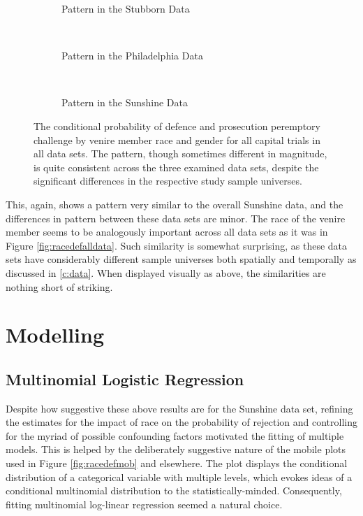 \begin{figure}[h!]
  \centering
  \begin{subfigure}{0.4\textwidth}
    \caption{\footnotesize Pattern in the Stubborn Data}
    \label{fig:stubcompgen}
  \end{subfigure}
  ~
  \begin{subfigure}{0.4\textwidth}
    \caption{\footnotesize Pattern in the Philadelphia Data}
    \label{fig:philcompgen}
  \end{subfigure}
  ~
  \begin{subfigure}{0.4\textwidth}
    \caption{\footnotesize Pattern in the Sunshine Data}
    \label{fig:suncompgen}
  \end{subfigure}
  \caption[Strikes by Race and Gender of Venire Member (All Capital Trial Data)]
  {\footnotesize The conditional probability of defence and prosecution peremptory challenge by venire member race and gender for
    all capital trials in all data sets. The pattern, though sometimes different in magnitude, is quite consistent across the three
    examined data sets, despite the significant differences in the respective study sample universes.}
  \label{fig:genderalldata}
\end{figure}

This, again, shows a pattern very similar to the overall Sunshine data, and the differences in pattern between these data sets are
minor. The race of the venire member seems to be analogously important across all data sets as it was in Figure
\ref{fig:racedefalldata}. Such similarity is somewhat surprising, as these data sets have considerably different sample
universes both spatially and temporally as discussed in \ref{c:data}. When displayed visually as above, the similarities are
nothing short of striking.

\section{Modelling} \label{sec:mods}

\subsection{Multinomial Logistic Regression}

Despite how suggestive these above results are for the Sunshine data set, refining the estimates for the impact of race on the
probability of rejection and controlling for the myriad of possible confounding factors motivated the fitting of multiple
models. This is helped by the deliberately suggestive nature of the mobile plots used in Figure \ref{fig:racedefmob} and
elsewhere. The plot displays the conditional distribution of a categorical variable with multiple levels, which evokes ideas of a
conditional multinomial distribution to the statistically-minded. Consequently, fitting multinomial log-linear regression seemed a
natural choice.


